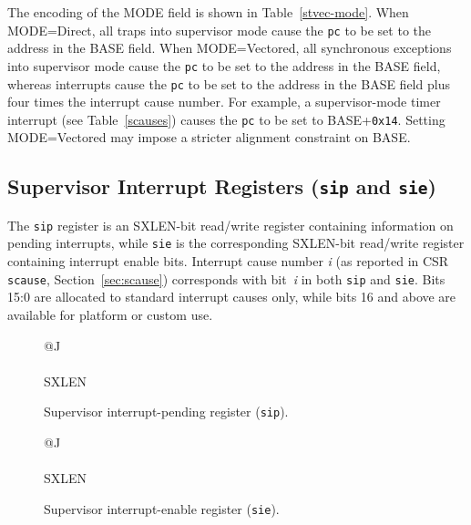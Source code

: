 The encoding of the MODE field is shown in Table~\ref{stvec-mode}.  When
MODE=Direct, all traps into supervisor mode cause the {\tt pc} to be set to the
address in the BASE field.  When MODE=Vectored, all synchronous exceptions
into supervisor mode cause the {\tt pc} to be set to the address in the BASE
field, whereas interrupts cause the {\tt pc} to be set to the address in
the BASE field plus four times the interrupt cause number.  For example,
a supervisor-mode timer interrupt (see Table~\ref{scauses}) causes the {\tt pc}
to be set to BASE+{\tt 0x14}.
Setting MODE=Vectored may impose a stricter alignment constraint on BASE.

\subsection{Supervisor Interrupt Registers ({\tt sip} and {\tt sie})}

The {\tt sip} register is an SXLEN-bit read/write register containing
information on pending interrupts, while {\tt sie} is the corresponding
SXLEN-bit read/write register containing interrupt enable bits.
Interrupt cause number \textit{i} (as reported in CSR {\tt scause},
Section~\ref{sec:scause}) corresponds with bit~\textit{i} in both
{\tt sip} and {\tt sie}.
Bits 15:0 are allocated to standard interrupt causes only, while bits 16
and above are available for platform or custom use.

\begin{figure}[h!]
{\footnotesize
\begin{center}
\begin{tabular}{@{}J}
 \\
\hline
{} \\
\hline
SXLEN \\
\end{tabular}
\end{center}
}
\vspace{-0.1in}
\caption{Supervisor interrupt-pending register ({\tt sip}).}
\label{sipreg}
\end{figure}

\begin{figure}[h!]
{\footnotesize
\begin{center}
\begin{tabular}{@{}J}
 \\
\hline
{} \\
\hline
SXLEN \\
\end{tabular}
\end{center}
}
\vspace{-0.1in}
\caption{Supervisor interrupt-enable register ({\tt sie}).}
\label{siereg}
\end{figure}

